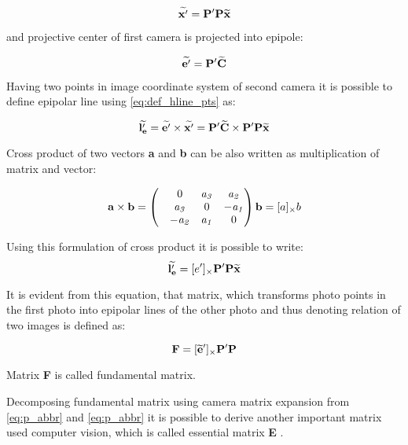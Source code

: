 \documentclass[a4paper,12pt]{report}
\newcommand{\ematr}[1]{
{\bf #1}
}
\newcommand{\evect}[1]{
{\bf #1}
}
\newcommand{\ehvect}[1]{
{\bf \widetilde{#1}}
}
\newcommand{\escal}[1]{
{\it #1}
}
\begin{document}
\begin{itemize}
\begin{equation}
\ehvect{x'} =  \ematr{P'}\ematr{P}\ehvect{x}
\end{equation}

and projective center of first camera is projected into epipole: 

\begin{equation}
\ehvect{e'} =  \ematr{P'}\ehvect{C}
\end{equation}

Having two points in image coordinate system of second camera it is possible to define epipolar line using \eqref{eq:def_hline_pts} as:

\begin{equation}
\ehvect{l'_{e}} =  \ehvect{e'} \times \ehvect{x'} = \ematr{P'}\ehvect{C} \times \ematr{P'}\ematr{P}\ehvect{x}
\end{equation}

Cross product of two vectors \evect{a} and \evect{b} can be also written as multiplication of matrix and vector:

\begin{equation}
\evect{a}  \times \evect{b}  = 
\begin{pmatrix}
   & 0      & \escal{a_{3}}   & \escal{a_{2}}\\
   & \escal{a_{3}}  & 0               & \escal{-a_{1}}\\
   & \escal{-a_{2}} & \escal{a_{1}}   & 0\\
\end{pmatrix}
\evect{b} = [a]_{\times} b
\end{equation}

Using this formulation of cross product it is possible to write:
\begin{equation}
\ehvect{l'_{e}}  = [e']_{\times} \ematr{P'}\ematr{P}\ehvect{x}
\end{equation}

It is evident from this equation, that matrix, which transforms photo points in the first photo into 
epipolar lines of the other photo and thus denoting relation of two images is defined as:

\begin{equation}
\ematr{F}  = [\ehvect{e}']_{\times} \ematr{P'}\ematr{P}
\end{equation}

Matrix \ematr{F} is called fundamental matrix. 

Decomposing fundamental matrix using camera matrix expansion from \eqref{eq:p_abbr} and \eqref{eq:p_abbr}
it is possible to derive another important matrix used computer vision, which is called essential matrix \ematr{E}.


\end{itemize}
\end{document}
